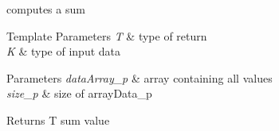 computes a sum 


\begin{DoxyTemplParams}{Template Parameters}
{\em T} & type of return \\
\hline
{\em K} & type of input data \\
\hline
\end{DoxyTemplParams}

\begin{DoxyParams}{Parameters}
{\em data\+Array\+\_\+p} & array containing all values \\
\hline
{\em size\+\_\+p} & size of array\+Data\+\_\+p \\
\hline
\end{DoxyParams}
\begin{DoxyReturn}{Returns}
T sum value 
\end{DoxyReturn}
